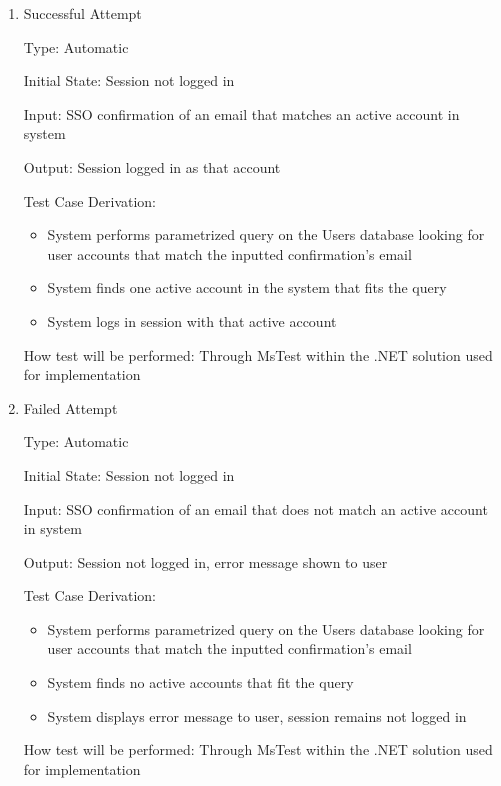 \documentclass[12pt, titlepage]{article}
\begin{document}
\begin{enumerate}

\item{Successful Attempt\\}

Type: Automatic
					
Initial State: Session not logged in
					
Input: SSO confirmation of an email that matches an active account in system
					
Output: Session logged in as that account

Test Case Derivation: 

\begin{itemize}
  \item System performs parametrized query on the Users database looking for user accounts that match the inputted confirmation's email
  \item System finds one active account in the system that fits the query
  \item System logs in session with that active account
\end{itemize}

How test will be performed: Through MsTest within the .NET solution used for implementation

\item{Failed Attempt\\}

Type: Automatic
					
Initial State: Session not logged in
					
Input: SSO confirmation of an email that does not match an active account in system
					
Output: Session not logged in, error message shown to user

Test Case Derivation: 

\begin{itemize}
  \item System performs parametrized query on the Users database looking for user accounts that match the inputted confirmation's email
  \item System finds no active accounts that fit the query
  \item System displays error message to user, session remains not logged in
\end{itemize}

How test will be performed: Through MsTest within the .NET solution used for implementation
    
\end{enumerate}
\end{document}
